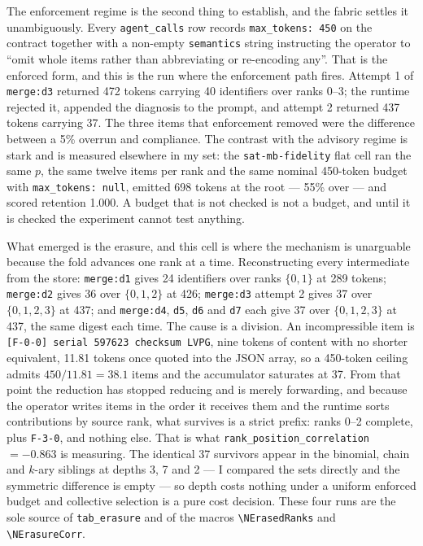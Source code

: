 \documentclass[11pt]{article}
\begin{document}
The enforcement regime is the second thing to establish, and the fabric settles it
unambiguously. Every \texttt{agent\_calls} row records \texttt{max\_tokens: 450} on the
contract together with a non-empty \texttt{semantics} string instructing the operator to
``omit whole items rather than abbreviating or re-encoding any''. That is the enforced
form, and this is the run where the enforcement path fires. Attempt 1 of \texttt{merge:d3}
returned 472 tokens carrying 40 identifiers over ranks 0--3; the runtime rejected it,
appended the diagnosis to the prompt, and attempt 2 returned 437 tokens carrying 37. The
three items that enforcement removed were the difference between a 5\% overrun and
compliance. The contrast with the advisory regime is stark and is measured elsewhere in my
set: the \texttt{sat-mb-fidelity} flat cell ran the same $p$, the same twelve items per
rank and the same nominal 450-token budget with \texttt{max\_tokens: null}, emitted 698
tokens at the root --- 55\% over --- and scored retention 1.000. A budget that is not
checked is not a budget, and until it is checked the experiment cannot test anything.

What emerged is the erasure, and this cell is where the mechanism is unarguable because
the fold advances one rank at a time. Reconstructing every intermediate from the store:
\texttt{merge:d1} gives 24 identifiers over ranks $\{0,1\}$ at 289 tokens;
\texttt{merge:d2} gives 36 over $\{0,1,2\}$ at 426; \texttt{merge:d3} attempt 2 gives 37
over $\{0,1,2,3\}$ at 437; and \texttt{merge:d4}, \texttt{d5}, \texttt{d6} and \texttt{d7}
each give 37 over $\{0,1,2,3\}$ at 437, the same digest each time. The cause is a
division. An incompressible item is \texttt{[F-0-0] serial 597623 checksum LVPG}, nine
tokens of content with no shorter equivalent, 11.81 tokens once quoted into the JSON
array, so a 450-token ceiling admits $450/11.81 = 38.1$ items and the accumulator saturates
at 37. From that point the reduction has stopped reducing and is merely forwarding, and
because the operator writes items in the order it receives them and the runtime sorts
contributions by source rank, what survives is a strict prefix: ranks 0--2 complete, plus
\texttt{F-3-0}, and nothing else. That is what \texttt{rank\_position\_correlation}
$=-0.863$ is measuring. The identical 37 survivors appear in the binomial, chain and
$k$-ary siblings at depths 3, 7 and 2 --- I compared the sets directly and the symmetric
difference is empty --- so depth costs nothing under a uniform enforced budget and
collective selection is a pure cost decision. These four runs are the sole source of
\texttt{tab\_erasure} and of the macros \texttt{\textbackslash NErasedRanks} and
\texttt{\textbackslash NErasureCorr}.
\end{document}
